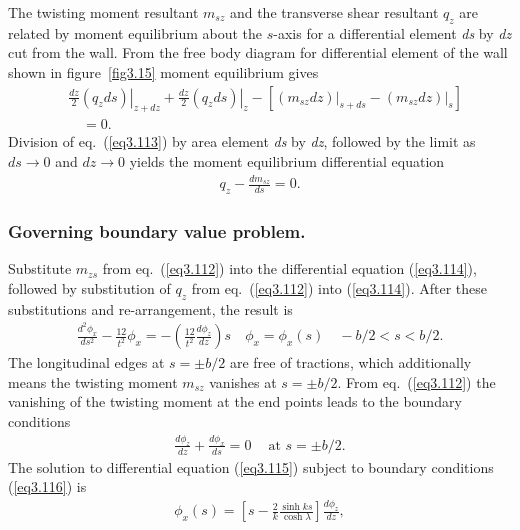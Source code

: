\documentclass{AeroStructure-ERJohnson}
\begin{document}
The twisting moment resultant $m_{s z}$ and the transverse shear resultant $q_{z}$ are related by moment equilibrium about the $s$-axis for a differential element \textit{ds} by \textit{dz} cut from the wall. From the free body diagram for differential element of the wall shown in figure~\ref{fig3.15} moment equilibrium gives
\begin{align}
&\left.\frac{d z}{2}\left(q_{z} d s\right)\right|_{z+d z}\!\!+\left.\frac{d z}{2}\left(q_{z} d s\right)\right|_{z}\!-[\left.(m_{s z} d z)\right|_{s+d s}-\left.(m_{s z} d z)\right|_{s}] \nonumber\\
&\quad =0. \label{eq3.113}
\end{align}
Division of eq.~(\ref{eq3.113}) by area element \textit{ds} by \textit{dz}, followed by the limit as $d s \rightarrow 0$ and $d z \rightarrow 0$ yields the moment equilibrium differential\vspace*{-8pt} equation
\begin{align}\label{eq3.114}
q_{z}-\frac{d m_{s z}}{d s}=0.
\end{align}

\vspace*{-12pt}

\subsubsection{Governing boundary value problem.} Substitute $m_{z s}$ from eq.~(\ref{eq3.112}) into the differential equation (\ref{eq3.114}), followed by substitution of $q_{z}$ from eq.~(\ref{eq3.112}) into (\ref{eq3.114}). After these substitutions and re-arrangement, the result\vspace*{-5pt} is
\begin{align}\label{eq3.115}
\frac{d^{2} \phi_{x}}{d s^{2}}-\frac{12}{t^{2}} \phi_{x}=-\left(\frac{12}{t^{2}} \frac{d \phi_{z}}{d z}\right) s \quad \phi_{x}=\phi_{x}(s) \quad-b / 2<s<b / 2.
\end{align}
The longitudinal edges at $s=\pm b / 2$ are free of tractions, which additionally means the twisting moment $m_{s z}$ vanishes at $s=\pm b / 2$. From eq.~(\ref{eq3.112}) the vanishing of the twisting moment at the end points leads to the boundary condition\vspace*{-4pt}s
\begin{align}\label{eq3.116}
\frac{d \phi_{z}}{d z}+\frac{d \phi_{x}}{d s}=0 \quad~\text{at } s=\pm b / 2.
\end{align}
The solution to differential equation (\ref{eq3.115}) subject to boundary conditions (\ref{eq3.116})\vspace*{-4pt} is
\begin{align}\label{eq3.117}
\phi_{x}(s)=\left[s-\frac{2}{k} \frac{\sinh k s}{\cosh \lambda}\right] \frac{d \phi_{z}}{d z},
\end{align}
\vspace*{-20pt}
\removelastskip
\end{document}
